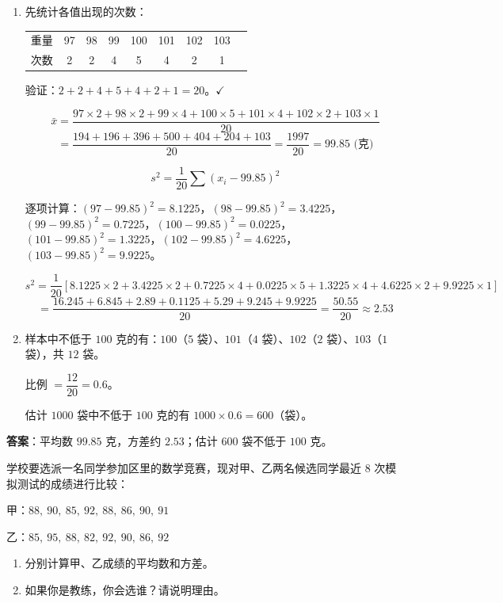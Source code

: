 \documentclass[12pt, a4paper]{ctexart}
\begin{document}
\begin{enumerate}[leftmargin=2em]
  \item 先统计各值出现的次数：

  \begin{center}
  \begin{tabular}{ccccccccc}
    \toprule
    重量 & 97 & 98 & 99 & 100 & 101 & 102 & 103 \\
    次数 & 2 & 2 & 4 & 5 & 4 & 2 & 1 \\
    \bottomrule
  \end{tabular}
  \end{center}

  验证：$2+2+4+5+4+2+1 = 20$。$\checkmark$

  $$\bar{x} = \frac{97\times2 + 98\times2 + 99\times4 + 100\times5 + 101\times4 + 102\times2 + 103\times1}{20}$$
  $$= \frac{194+196+396+500+404+204+103}{20} = \frac{1997}{20} = 99.85 \text{ (克)}$$

  $$s^2 = \frac{1}{20}\sum(x_i - 99.85)^2$$

  逐项计算：$(97-99.85)^2 = 8.1225$，$(98-99.85)^2 = 3.4225$，$(99-99.85)^2 = 0.7225$，$(100-99.85)^2 = 0.0225$，$(101-99.85)^2 = 1.3225$，$(102-99.85)^2 = 4.6225$，$(103-99.85)^2 = 9.9225$。

  $$s^2 = \frac{1}{20}[8.1225\times2 + 3.4225\times2 + 0.7225\times4 + 0.0225\times5 + 1.3225\times4 + 4.6225\times2 + 9.9225\times1]$$
  $$= \frac{16.245 + 6.845 + 2.89 + 0.1125 + 5.29 + 9.245 + 9.9225}{20} = \frac{50.55}{20} \approx 2.53$$

  \item 样本中不低于 $100$ 克的有：$100$（$5$ 袋）、$101$（$4$ 袋）、$102$（$2$ 袋）、$103$（$1$ 袋），共 $12$ 袋。

  比例 $= \dfrac{12}{20} = 0.6$。

  估计 $1000$ 袋中不低于 $100$ 克的有 $1000 \times 0.6 = 600$（袋）。
\end{enumerate}

\textbf{答案}：平均数 $99.85$ 克，方差约 $2.53$；估计 $600$ 袋不低于 $100$ 克。

\begin{appbox}
学校要选派一名同学参加区里的数学竞赛，现对甲、乙两名候选同学最近 $8$ 次模拟测试的成绩进行比较：

甲：$88,\ 90,\ 85,\ 92,\ 88,\ 86,\ 90,\ 91$

乙：$85,\ 95,\ 88,\ 82,\ 92,\ 90,\ 86,\ 92$

\begin{enumerate}[leftmargin=2em]
  \item 分别计算甲、乙成绩的平均数和方差。
  \item 如果你是教练，你会选谁？请说明理由。
\end{enumerate}
\end{appbox}
\end{document}
